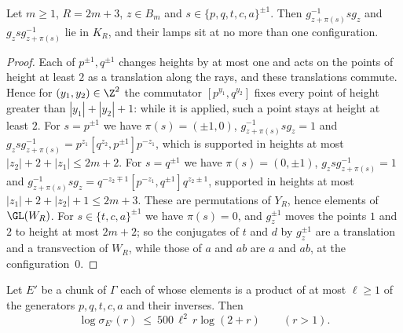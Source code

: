 \begin{lemma}[Cocycles]\label{lem:clock}
Let $m\ge1$, $R=2m+3$, $z\in B_m$ and $s\in\{p,q,t,c,a\}^{\pm1}$. Then $g_{z+\pi(s)}^{-1}sg_z$ and $g_zsg_{z+\pi(s)}^{-1}$ lie in $K_R$, and their
lamps sit at no more than one configuration.
\end{lemma}

\begin{proof}
Each of $p^{\pm1},q^{\pm1}$ changes heights by at most one and acts on the points of height at least $2$ as a translation along the rays, and these
translations commute. Hence for $(y_1,y_2)\in\Z^2$ the commutator $[p^{y_1},q^{y_2}]$ fixes every point of height greater than $|y_1|+|y_2|+1$:
while it is applied, such a point stays at height at least $2$. For $s=p^{\pm1}$ we have $\pi(s)=(\pm1,0)$, $g_{z+\pi(s)}^{-1}sg_z=1$ and
$g_zsg_{z+\pi(s)}^{-1}=p^{z_1}[q^{z_2},p^{\pm1}]p^{-z_1}$, which is supported in heights at most $|z_2|+2+|z_1|\le2m+2$. For $s=q^{\pm1}$ we have
$\pi(s)=(0,\pm1)$, $g_zsg_{z+\pi(s)}^{-1}=1$ and $g_{z+\pi(s)}^{-1}sg_z=q^{-z_2\mp1}[p^{-z_1},q^{\pm1}]q^{z_2\pm1}$, supported in heights at most
$|z_1|+2+|z_2|+1\le2m+3$. These are permutations of
$Y_R$, hence elements of $\GL(W_R)$. For $s\in\{t,c,a\}^{\pm1}$ we have $\pi(s)=0$, and $g_z^{\pm1}$ moves the points $1$ and $2$ to height at most
$2m+2$; so the conjugates of $t$ and $d$ by $g_z^{\pm1}$ are a translation and a transvection of $W_R$, while those of $a$ and $ab$ are $a$ and
$ab$, at the configuration~$0$.
\end{proof}

\begin{proposition}\label{prop:upper}
Let $E'$ be a chunk of $\Gamma$ each of whose elements is a product of at most $\ell\ge1$ of the generators $p,q,t,c,a$ and their inverses. Then
\[
\log\sigma_{E'}(r)\ \le\ 500\,\ell^2\,r\log(2+r)\qquad(r>1).
\]
\end{proposition}

